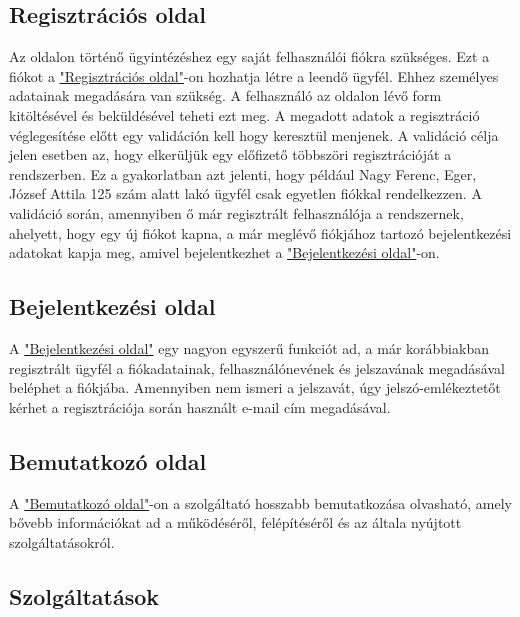 \documentclass[centeredchapter]{thesis-ekf}
\theoremstyle{definition}
\theoremstyle{remark}
\begin{document}
\subsection{Regisztrációs oldal}\hypertarget{leiras-regisztracios}{}

Az oldalon történő ügyintézéshez egy saját felhasználói fiókra szükséges. Ezt a fiókot a \hyperlink{leiras-regisztracios}{"Regisztrációs oldal"}-on hozhatja létre a leendő ügyfél. Ehhez személyes adatainak megadására van szükség. A felhasználó az oldalon lévő form kitöltésével és beküldésével teheti ezt meg. A megadott adatok a regisztráció véglegesítése előtt egy validáción kell hogy keresztül menjenek. A validáció célja jelen esetben az, hogy elkerüljük egy előfizető többszöri regisztrációját a rendszerben. Ez a gyakorlatban azt jelenti, hogy például Nagy Ferenc, Eger, József Attila 125 szám alatt lakó ügyfél csak egyetlen fiókkal rendelkezzen. A validáció során, amennyiben ő már regisztrált felhasználója a rendszernek, ahelyett, hogy egy új fiókot kapna, a már meglévő fiókjához tartozó bejelentkezési adatokat kapja meg, amivel bejelentkezhet a \hyperlink{leiras-bej}{"Bejelentkezési oldal"}-on.

\subsection{Bejelentkezési oldal}\hypertarget{leiras-bejelentkezesi}{}

A \hyperlink{leiras-bejelentkezesi}{"Bejelentkezési oldal"} egy nagyon egyszerű funkciót ad, a már korábbiakban regisztrált ügyfél a fiókadatainak, felhasználónevének és jelszavának megadásával beléphet a fiókjába. Amennyiben nem ismeri a jelszavát, úgy jelszó-emlékeztetőt kérhet a regisztrációja során használt e-mail cím megadásával.

\subsection{Bemutatkozó oldal}\hypertarget{leiras-bemutatkozo}{}

A \hyperlink{leiras-bemutatkozo}{"Bemutatkozó oldal"}-on a szolgáltató hosszabb bemutatkozása olvasható, amely bővebb információkat ad a működéséről, felépítéséről és az általa nyújtott szolgáltatásokról.

\subsection{Szolgáltatások}\hypertarget{leiras-szolgaltatasok}{}
\end{document}
